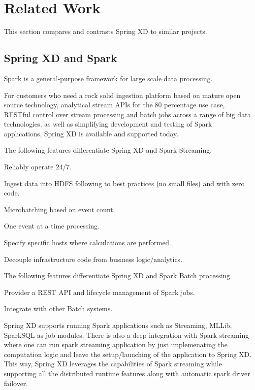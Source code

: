 \section{Related Work}
This section compares and contrasts Spring XD to similar projects.

\subsection{Spring XD and Spark}
Spark is a general-purpose framework for large scale data processing.

For customers who need a rock solid ingestion platform based on mature open source technology, analytical stream APIs for the 80 percentage use case, RESTful control over stream processing and batch jobs across a range of big data technologies, as well as simplifying development and testing of Spark applications, Spring XD is available and supported today.

The following features differentiate Spring XD and Spark Streaming.

\begin{itemize*}
\item Reliably operate 24/7.
\item Ingest data into HDFS following to best practices (no small files) and with zero code.
\item Microbatching based on event count.
\item One event at a time processing.
\item Specify specific hosts where calculations are performed.
\item Decouple infrastructure code from business logic\slash analytics.
\end{itemize*}

The following features differentiate Spring XD and Spark Batch processing.

\begin{itemize*}
\item Provider a REST API and lifecycle management of Spark jobs.
\item Integrate with other Batch systems.
\end{itemize*}

Spring XD supports running Spark applications such as Streaming, MLLib, SparkSQL as job modules.
There is also a deep integration with Spark streaming where one can run spark streaming application by just implemenating
the computation logic and leave the setup/launching of the application to Spring XD. This way, Spring XD leverages the
capabilities of Spark streaming while supporting all the distributed runtime features along with automatic spark driver
failover.

